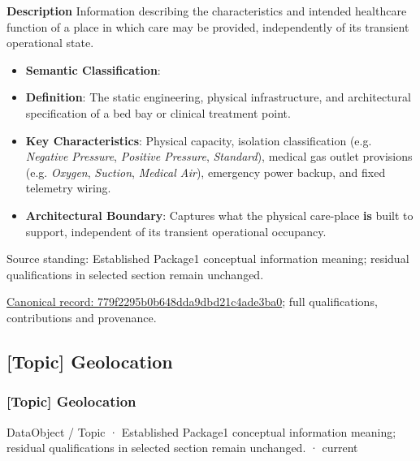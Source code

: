 \textbf{Description}
Information describing the characteristics and intended healthcare function of a place in which care may be provided, independently of its transient operational state.



\begin{itemize}


\item \textbf{Semantic Classification}: \texttt{}

\item \textbf{Definition}: The static engineering, physical infrastructure, and architectural specification of a bed bay or clinical treatment point.

\item \textbf{Key Characteristics}: Physical capacity, isolation classification (e.g. \emph{Negative Pressure}, \emph{Positive Pressure}, \emph{Standard}), medical gas outlet provisions (e.g. \emph{Oxygen}, \emph{Suction}, \emph{Medical Air}), emergency power backup, and fixed telemetry wiring.

\item \textbf{Architectural Boundary}: Captures what the physical care-place \textbf{is} built to support, independent of its transient operational occupancy.

\end{itemize}


Source standing: Established Package1 conceptual information meaning; residual qualifications in selected section remain unchanged.


{\footnotesize \href{../../../../continuum/application/data-object/topic/779f2295b0b648dda9dbd21c4ade3ba0.md}{Canonical record: 779f2295b0b648dda9dbd21c4ade3ba0}; full qualifications, contributions and provenance.}\par
\subsection{[Topic] Geolocation}

\subsubsection{[Topic] Geolocation}

\label{element:771b2e814946401bbe6dd6b4fdd3fb42}
{\small DataObject / Topic · Established Package1 conceptual information meaning; residual qualifications in selected section remain unchanged. · current}\par

